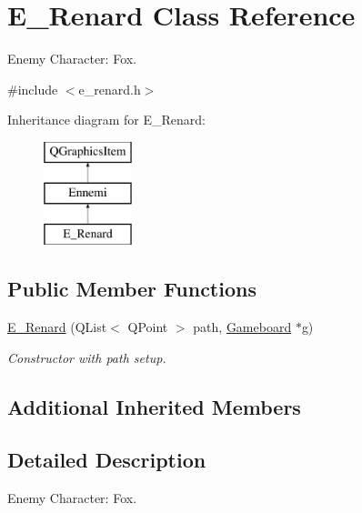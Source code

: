\hypertarget{class_e___renard}{}\section{E\+\_\+\+Renard Class Reference}
\label{class_e___renard}


Enemy Character\+: Fox.  




{\ttfamily \#include $<$e\+\_\+renard.\+h$>$}

Inheritance diagram for E\+\_\+\+Renard\+:\begin{figure}[H]
\begin{center}
\leavevmode
\includegraphics[height=3.000000cm]{class_e___renard}
\end{center}
\end{figure}
\subsection*{Public Member Functions}
\begin{DoxyCompactItemize}
\item 
\hyperlink{class_e___renard_aa5c7e87d02089ed76c306a3434133645}{E\+\_\+\+Renard} (Q\+List$<$ Q\+Point $>$ path, \hyperlink{class_gameboard}{Gameboard} $\ast$g)
\begin{DoxyCompactList}\small\item\em Constructor with path setup. \end{DoxyCompactList}\end{DoxyCompactItemize}
\subsection*{Additional Inherited Members}


\subsection{Detailed Description}
Enemy Character\+: Fox. 

